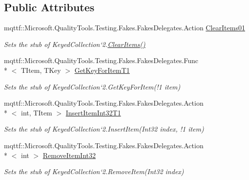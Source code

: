 \subsection*{Public Attributes}
\begin{DoxyCompactItemize}
\item 
mqttf\-::\-Microsoft.\-Quality\-Tools.\-Testing.\-Fakes.\-Fakes\-Delegates.\-Action \hyperlink{class_system_1_1_collections_1_1_object_model_1_1_fakes_1_1_stub_keyed_collection_3_01_t_key_00_01_t_item_01_4_aff860554292897ff423accde8d3b0727}{Clear\-Items01}
\begin{DoxyCompactList}\small\item\em Sets the stub of Keyed\-Collection`2.\hyperlink{class_system_1_1_collections_1_1_object_model_1_1_fakes_1_1_stub_keyed_collection_3_01_t_key_00_01_t_item_01_4_a72c488aa9e4423358251d529a0650f77}{Clear\-Items()}\end{DoxyCompactList}\item 
mqttf\-::\-Microsoft.\-Quality\-Tools.\-Testing.\-Fakes.\-Fakes\-Delegates.\-Func\\*
$<$ T\-Item, T\-Key $>$ \hyperlink{class_system_1_1_collections_1_1_object_model_1_1_fakes_1_1_stub_keyed_collection_3_01_t_key_00_01_t_item_01_4_a9dd8fda8dfa7fc0a1a2f62d11f8680e7}{Get\-Key\-For\-Item\-T1}
\begin{DoxyCompactList}\small\item\em Sets the stub of Keyed\-Collection`2.Get\-Key\-For\-Item(!1 item)\end{DoxyCompactList}\item 
mqttf\-::\-Microsoft.\-Quality\-Tools.\-Testing.\-Fakes.\-Fakes\-Delegates.\-Action\\*
$<$ int, T\-Item $>$ \hyperlink{class_system_1_1_collections_1_1_object_model_1_1_fakes_1_1_stub_keyed_collection_3_01_t_key_00_01_t_item_01_4_ac6b9887df2564114f69ccb6980b7f50f}{Insert\-Item\-Int32\-T1}
\begin{DoxyCompactList}\small\item\em Sets the stub of Keyed\-Collection`2.Insert\-Item(Int32 index, !1 item)\end{DoxyCompactList}\item 
mqttf\-::\-Microsoft.\-Quality\-Tools.\-Testing.\-Fakes.\-Fakes\-Delegates.\-Action\\*
$<$ int $>$ \hyperlink{class_system_1_1_collections_1_1_object_model_1_1_fakes_1_1_stub_keyed_collection_3_01_t_key_00_01_t_item_01_4_aa173f6830720e245e3e112b54f5afc36}{Remove\-Item\-Int32}
\begin{DoxyCompactList}\small\item\em Sets the stub of Keyed\-Collection`2.Remove\-Item(\-Int32 index)\end{DoxyCompactList}\item 

\end{DoxyCompactItemize}
